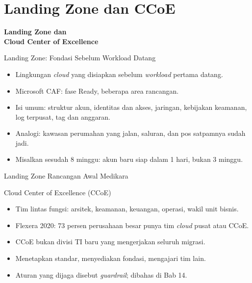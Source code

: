\documentclass[aspectratio=169, table, 12pt]{beamer}
\begin{document}
\section{Landing Zone dan CCoE}

\begin{frame}{\hfill}
  \centering
  \Huge{\textbf{Landing Zone dan\\Cloud Center of Excellence}}
\end{frame}

\begin{frame}{Landing Zone: Fondasi Sebelum Workload Datang}
  \begin{itemize}
    \item Lingkungan \textit{cloud} yang disiapkan sebelum \textit{workload} pertama
          datang.
    \item Microsoft CAF: fase Ready, beberapa area rancangan.
    \item Isi umum: struktur akun, identitas dan akses, jaringan, kebijakan keamanan,
          log terpusat, tag dan anggaran.
    \item Analogi: kawasan perumahan yang jalan, saluran, dan pos satpamnya sudah jadi.
    \item Misalkan sesudah 8 minggu: akun baru siap dalam 1 hari, bukan 3 minggu.
  \end{itemize}
\end{frame}

\begin{frame}{Landing Zone Rancangan Awal Medikara}
  \centering
\end{frame}

\begin{frame}{Cloud Center of Excellence (CCoE)}
  \begin{itemize}
    \item Tim lintas fungsi: arsitek, keamanan, keuangan, operasi, wakil unit bisnis.
    \item Flexera 2020: 73 persen perusahaan besar punya tim \textit{cloud} pusat atau
          CCoE.
    \item CCoE bukan divisi TI baru yang mengerjakan seluruh migrasi.
    \item Menetapkan standar, menyediakan fondasi, mengajari tim lain.
    \item Aturan yang dijaga disebut \textit{guardrail}; dibahas di Bab 14.
  \end{itemize}
\end{frame}
\end{document}
